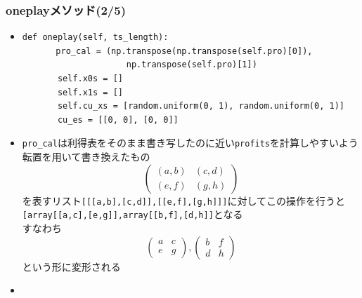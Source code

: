 \documentclass[dvipdfmx,fleqn,handout]{beamer}
\begin{document}
\begin{frame}[fragile]%
\frametitle{oneplayメソッド(2/5)}
\begin{itemize}\setlength{\parskip}{0.5em}
\item
\footnotesize
\begin{verbatim}
def oneplay(self, ts_length):
　　　　pro_cal = (np.transpose(np.transpose(self.pro)[0]),
                   　np.transpose(self.pro)[1])
       self.x0s = []
       self.x1s = []
       self.cu_xs = [random.uniform(0, 1), random.uniform(0, 1)]
       cu_es = [[0, 0], [0, 0]]
 \end{verbatim}
\normalsize
\item
\verb|pro_cal|は利得表をそのまま書き写したのに近い\verb|profits|を計算しやすいよう転置を用いて書き換えたもの\pause
\footnotesize
\begin{equation*}
\begin{pmatrix}
(a,b) & (c,d)\\
(e,f) & (g,h)
\end{pmatrix}
\end{equation*}
\normalsize
を表すリスト\verb|[[[a,b],[c,d]],[[e,f],[g,h]]]|に対してこの操作を行うと\pause
\verb|[array[[a,c],[e,g]],array[[b,f],[d,h]]|となる\\すなわち
\footnotesize
\begin{equation*}
\begin{pmatrix}
a & c\\
e & g
\end{pmatrix},
\begin{pmatrix}
b & f\\
d & h
\end{pmatrix}
\end{equation*}
\normalsize
という形に変形される
\item
\end{itemize}
\end{frame}
 
\end{document}
